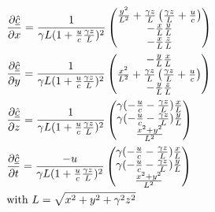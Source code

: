 \begin{equation}
	\begin{aligned}
		 & \frac{\partial \underline{\hat{c}}}{\partial x}  =
		\frac{1}{\gamma  L ( 1 + \frac{u}{c} \frac{\gamma z}{L} )^2}
		\begin{pmatrix}
			\frac{y^2}{ L^2} + \frac{\gamma z}{ L} \left(\frac{\gamma z}{L}+\frac{u}{c}\right) \\
			- \frac{x}{L} \frac{y}{L}                                                          \\
			- \frac{x}{L} \frac{z}{L}
		\end{pmatrix}                                  \\
		 & \frac{\partial \underline{\hat{c}}}{\partial y}  =
		\frac{1}{\gamma  L (1+ \frac{u}{c} \frac{\gamma z}{L} )^2}
		\begin{pmatrix}
			- \frac{y}{L} \frac{x}{L}                                                          \\
			\frac{x^2}{ L^2} + \frac{\gamma z}{ L} \left(\frac{\gamma z}{L}+\frac{u}{c}\right) \\
			- \frac{y}{L} \frac{z}{L}
		\end{pmatrix}                                  \\
		 & \frac{\partial \underline{\hat{c}}}{\partial z}  = \frac{1}{\gamma  L
			( 1 + \frac{u}{c} \frac{\gamma z}{L} )^2}
		\begin{pmatrix}
			\gamma ( - \frac{u}{c}  - \frac{ \gamma z }{L} ) \frac{x}{L} \\
			\gamma ( - \frac{u}{c}  - \frac{\gamma z }{L} ) \frac{y}{L}  \\
			\frac{ x^2 + y^2 }{ L^2}
		\end{pmatrix}                                                        \\
		 & \frac{\partial \underline{\hat{c}}}{\partial t}  = \frac{-u}{\gamma  L ( 1 + \frac{u}{c} \frac{\gamma z}{L} )^2}
		\begin{pmatrix}
			\gamma ( - \frac{u}{c}  - \frac{ \gamma z }{L} ) \frac{x}{L} \\
			\gamma ( - \frac{u}{c}  - \frac{\gamma z }{L} ) \frac{y}{L}  \\
			\frac{ x^2 + y^2 }{ L^2}
		\end{pmatrix}                                                        \\
		 & \text{with $ L=\sqrt{x^2 + y^2 + \gamma^2 z^2}$ }
	\end{aligned}
\end{equation}

